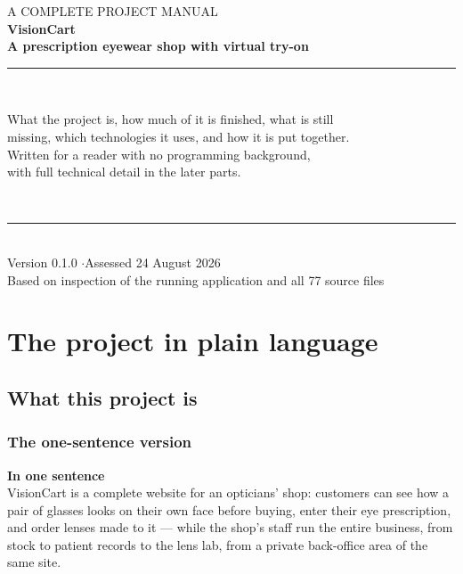 \documentclass[11pt,a4paper]{report}
\newcommand{\keybox}[2]{%
  \begin{center}
  \begin{minipage}{0.94\textwidth}
  \colorbox{vclight}{\parbox{\dimexpr\textwidth-2\fboxsep}{%
    \vspace{3pt}\textbf{\color{vcblue}#1}\\[3pt]#2\vspace{4pt}}}
  \end{minipage}
  \end{center}}
\begin{document}
\begin{titlepage}
\centering
\vspace*{2.2cm}
{\color{vcgrey}\Large A COMPLETE PROJECT MANUAL}\\[1.1cm]
{\color{vcblue}\Huge\bfseries VisionCart}\\[0.45cm]
{\Large\bfseries A prescription eyewear shop with virtual try-on}\\[1.4cm]
\rule{0.75\textwidth}{0.9pt}\\[0.8cm]
\begin{minipage}{0.78\textwidth}
\centering\large
What the project is, how much of it is finished, what is still\\
missing, which technologies it uses, and how it is put together.\\[0.6cm]
\normalsize\color{vcgrey}
Written for a reader with no programming background,\\
with full technical detail in the later parts.
\end{minipage}\\[1.6cm]
\rule{0.75\textwidth}{0.9pt}\\[1.0cm]
{\color{vcgrey}\normalsize
Version 0.1.0 \quad$\cdot$\quad Assessed 24 August 2026\\[3pt]
Based on inspection of the running application and all 77 source files}
\vfill
\end{titlepage}

\tableofcontents
\newpage

\part{The project in plain language}

\chapter{What this project is}

\section{The one-sentence version}

\keybox{In one sentence}{VisionCart is a complete website for an
opticians' shop: customers can see how a pair of glasses looks on their own
face before buying, enter their eye prescription, and order lenses made to
it --- while the shop's staff run the entire business, from stock to patient
records to the lens lab, from a private back-office area of the same site.}
\end{document}

